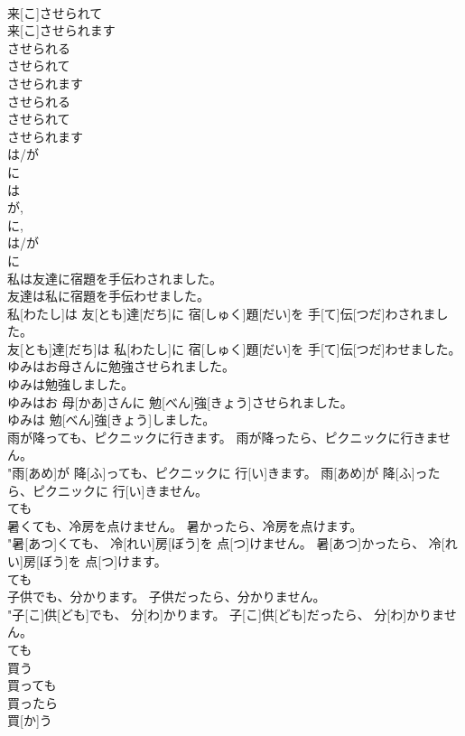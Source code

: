 \documentclass[8pt]{extreport}
\begin{document}
\begin{CJK}{UTF8}{min}
\\	来[こ]させられて 
\\	来[こ]させられます
\\	させられる 
\\	させられて 
\\	させられます	
\\	させられる 
\\	させられて 
\\	させられます
\\	は/が 
\\	に 
\\	は 
\\	が, 
\\	に, 
\\	は/が 
\\	に 
\\	私は友達に宿題を手伝わされました。 
\\	友達は私に宿題を手伝わせました。	
\\	私[わたし]は 友[とも]達[だち]に 宿[しゅく]題[だい]を 手[て]伝[つだ]わされました。 
\\	友[とも]達[だち]は 私[わたし]に 宿[しゅく]題[だい]を 手[て]伝[つだ]わせました。 
\\	ゆみはお母さんに勉強させられました。 
\\	ゆみは勉強しました。	
\\	ゆみはお 母[かあ]さんに 勉[べん]強[きょう]させられました。 
\\	ゆみは 勉[べん]強[きょう]しました。 
\\	雨が降っても、ピクニックに行きます。 雨が降ったら、ピクニックに行きません。	
\\	"雨[あめ]が 降[ふ]っても、ピクニックに 行[い]きます。 雨[あめ]が 降[ふ]ったら、ピクニックに 行[い]きません。 
\\	ても 
\\	暑くても、冷房を点けません。 暑かったら、冷房を点けます。	
\\	"暑[あつ]くても、 冷[れい]房[ぼう]を 点[つ]けません。 暑[あつ]かったら、 冷[れい]房[ぼう]を 点[つ]けます。 
\\	ても 
\\	子供でも、分かります。 子供だったら、分かりません。	
\\	"子[こ]供[ども]でも、 分[わ]かります。 子[こ]供[ども]だったら、 分[わ]かりません。 
\\	ても 
\\	買う 
\\	買っても 
\\	買ったら	
\\	買[か]う 

\end{CJK}
\end{document}
